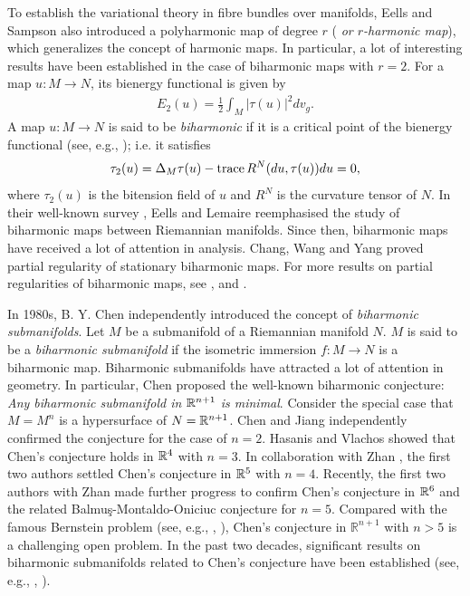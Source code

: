\documentclass{amsart}
\theoremstyle{definition}
\numberwithin{equation}{section}
\begin{document}
 To establish the variational theory in fibre bundles over manifolds,  Eells and Sampson \cite{ES1} also introduced a polyharmonic map of degree $r$ ({\it
 or $r$-harmonic map}), which  generalizes the concept of harmonic maps. In particular,   a lot of interesting results have been established in
 the   case of biharmonic maps with $r=2$.
 For a  map $u: M\to N$, its bienergy functional is given by
\begin{eqnarray}\label{bienergy}
E_2(u)=\frac{1}{2}\int_M|\tau(u )|^2dv_g.\nonumber
\end{eqnarray}
A map $u: M\to N$  is said to be {\it biharmonic} if it is
 a critical point of the bienergy functional (see, e.g., \cite{EL}); i.e. it satisfies
\begin{equation}\label{Bi Map1}
\tau_2(u)=\Delta_M\tau(u)-{\rm trace}\,
R^{N}(d u,\tau(u))du=0,
\end{equation}
where $\tau_2(u)$ is the bitension field of $u$ and $R^{N}$ is the curvature tensor of $N$. In their well-known survey \cite{EL},  Eells and
Lemaire
reemphasised the study of
 biharmonic maps between Riemannian manifolds.   Since then,  biharmonic maps have received a lot of attention in analysis.  Chang, Wang and Yang
\cite{CWY} proved  partial
regularity of stationary biharmonic maps.  For  more
results
on partial regularities of biharmonic maps, see \cite{W},  \cite{St3} and \cite {HY1}.

  In 1980s, B. Y. Chen  independently introduced  the concept of {\em biharmonic submanifolds}.
   Let  $M$  be a submanifold of a Riemannian manifold  $N$.
  $M$ is said to be a \textit{biharmonic submanifold}  if the isometric
 immersion $f: M\to N$ is a biharmonic map. Biharmonic submanifolds have attracted a lot of attention  in geometry.
  In particular, Chen \cite{Chen1991} proposed the  well-known biharmonic conjecture:
 \textit{Any biharmonic submanifold in  $\Bbb R^{n+1}$
is minimal}. Consider the special case that $M=M^n$ is a  hypersurface
 of $N=\Bbb R^{n+1}$.
 Chen \cite{Chen1991} and Jiang \cite{jiang1987} independently confirmed the conjecture for the case of $n=2$.  Hasanis and
Vlachos  \cite{Hasanis1995} showed that Chen's conjecture holds  in    $\Bbb R^4$ with $n=3$. In collaboration
with   Zhan
\cite{FHZ},   the first two authors   settled
Chen's conjecture  in $\Bbb R^5$ with $n=4$.  Recently, the first two authors with Zhan \cite{FHZ1} made   further progress to confirm
Chen's  conjecture in  $\Bbb R^{6}$ and the related Balmu\c{s}-Montaldo-Oniciuc conjecture for  $n=5$. Compared with the famous Bernstein problem  (see, e.g., \cite{Bombieri1969},
\cite{Simon-1968}),
Chen's conjecture in $\mathbb R^{n+1}$ with $n>5$ is a challenging  open problem. In  the past
 two decades,   significant  results  on biharmonic submanifolds related to  Chen's  conjecture have been established  (see, e.g.,
 \cite{OC20}, \cite{Fetcu}).
\end{document}
